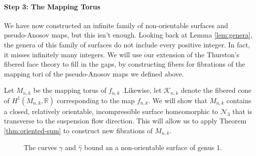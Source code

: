 \paragraph{Step 3: The Mapping Torus}

We have now constructed an infinite family of non-orientable surfaces and pseudo-Anosov maps, but this isn't
enough. Looking back at Lemma \ref{lem:genera}, the genera of this family of surfaces do not include every
positive integer. In fact, it misses infinitely many integers. We will use our extension of the Thurston's
fibered face theory to fill in the gaps, by constructing fibers for fibrations of the mapping tori of the
pseudo-Anosov maps we defined above.

Let $M_{n,k}$ be the mapping torus of $f_{n,k}$ .Likewise, let $\mathcal{K}_{n,k}$ denote the fibered cone of
$H^1(M_{n,k},\mathbb{R})$ corresponding to the map $f_{n,k}$. We will show that $M_{n,k}$ contains a closed,
relatively orientable, incompressible surface homeomorphic to $\mathcal{N}_3$ that is transverse to the
suspension flow direction. This will allow us to apply Theorem \ref{thm:oriented-sum} to construct
new fibrations of $M_{n,k}$.

\begin{figure}[h]
    \centering
    \caption{The curves $\gamma$ and $\hat{\gamma}$ bound an a non-orientable surface of genus 1.}
    \label{fig:gammacurves}
\end{figure}

